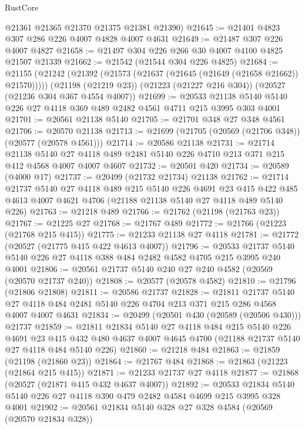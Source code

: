 \begin{lexlean}{RustCore}
\begin{coremodule}
      @21361
      @21365
      @21370
      @21375
      @21381
      @21390)
@21645 := @21401 @4823 @307 @286 @226 @4007 @4828 @4007 @4631
@21649 := @21487 @307 @226 @4007 @4827
@21658 := @21497 @304 @226 @266 @30 @4007 @4100 @4825 @21507 @21339
@21662 := @21542 (@21544 @304 @226 @4825)
@21684 := @21155
    (@21242 (@21392 (@21573 (@21637 (@21645 (@21649 (@21658 @21662)) @21570)))))
    (@21198 (@21219 @23))
    (@21223 (@21227 @216 @304))
    (@20527 (@21236 @304 @367 @4554 @4007))
@21699 := @20533 @21138 @5140 @5140 @226 @27 @4118 @369 @489 @2482 @4561 @4711 @215 @3995 @303 @4001
@21701 := @20561 @21138 @5140
@21705 := @21701 @348 @27 @348 @4561
@21706 := @20570 @21138
@21713 := @21699 (@21705 (@20569 (@21706 @348)) (@20577 (@20578 @4561)))
@21714 := @20586 @21138
@21731 := @21714
    @21138
    @5140
    @27
    @4118
    @489
    @2481
    @5140
    @226
    @4710
    @213
    @371
    @215
    @412
    @4568
    @4007
    @4007
    @4607
@21732 := @20501 @420
@21734 := @20589 (@4000 @17)
@21737 := @20499 (@21732 @21734) @21138
@21762 := @21714
    @21737
    @5140
    @27
    @4118
    @489
    @215
    @5140
    @226
    @4691
    @23
    @415
    @422
    @485
    @4613
    @4007
    @4621
    @4706
    (@21188 @21138 @5140 @27 @4118 @489 @5140 @226)
@21763 := @21218 @489
@21766 := @21762 (@21198 (@21763 @23))
@21767 := @21225 @27
@21768 := @21767 @489
@21772 := @21766 (@21223 (@21768 @215 @415))
@21775 := @21233 @21138 @27 @4118
@21781 := @21772 (@20527 (@21775 @415 @422 @4613 @4007))
@21796 := @20533 @21737 @5140 @5140 @226 @27 @4118 @388 @484 @2482 @4582 @4705 @215 @3995 @240 @4001
@21806 := @20561 @21737 @5140 @240 @27 @240 @4582 (@20569 (@20570 @21737 @240))
@21808 := @20577 (@20578 @4582)
@21810 := @21796 (@21806 @21808)
@21811 := @20586 @21737
@21828 := @21811
    @21737
    @5140
    @27
    @4118
    @484
    @2481
    @5140
    @226
    @4704
    @213
    @371
    @215
    @286
    @4568
    @4007
    @4007
    @4631
@21834 := @20499 (@20501 @430 (@20589 (@20506 @430))) @21737
@21859 := @21811
    @21834
    @5140
    @27
    @4118
    @484
    @215
    @5140
    @226
    @4691
    @23
    @415
    @432
    @480
    @4637
    @4007
    @4645
    @4700
    (@21188 @21737 @5140 @27 @4118 @484 @5140 @226)
@21860 := @21218 @484
@21863 := @21859 (@21198 (@21860 @23))
@21864 := @21767 @484
@21868 := @21863 (@21223 (@21864 @215 @415))
@21871 := @21233 @21737 @27 @4118
@21877 := @21868 (@20527 (@21871 @415 @432 @4637 @4007))
@21892 := @20533 @21834 @5140 @5140 @226 @27 @4118 @390 @479 @2482 @4584 @4699 @215 @3995 @328 @4001
@21902 := @20561 @21834 @5140 @328 @27 @328 @4584 (@20569 (@20570 @21834 @328))

\end{coremodule}
\end{lexlean}
